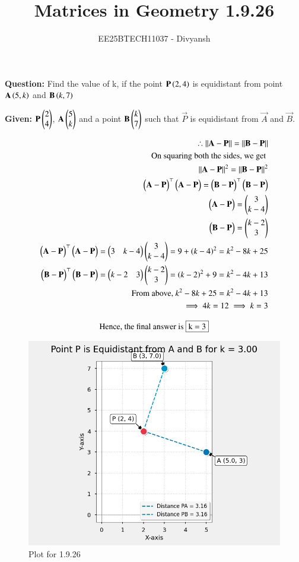 \documentclass[journal,12pt,onecolumn]{IEEEtran}
\title{Matrices in Geometry 1.9.26}
\author{EE25BTECH11037 - Divyansh}
\theoremstyle{remark}
\begin{document}
\vspace{3cm}
\maketitle
{\let\newpage\relax\maketitle}
\textbf{Question: }
Find the value of k, if the point $\mathbf{P}\left(2,4\right)$ is equidistant from point $\mathbf{A}\left(5,k\right)$ and $\mathbf{B}\left(k,7\right)$

\textbf{Given: } 
$\mathbf{P}\begin{pmatrix}2\\4\end{pmatrix}$, $\mathbf{A}\begin{pmatrix}5\\k\end{pmatrix}$ and a point $\mathbf{B} \begin{pmatrix}k \\ 7\end{pmatrix}$ such that $\vec{P}$ is equidistant from $\vec{A}$ and $\vec{B}$. 

\begin{align*}
    \therefore \left\lVert\mathbf{A}-\mathbf{P}\right\rVert=\left\lVert\mathbf{B}-\mathbf{P}\right\rVert\\
    \text{On squaring both the sides, we get }\\
    \left\lVert\mathbf{A}-\mathbf{P}\right\rVert^2=\left\lVert\mathbf{B}-\mathbf{P}\right\rVert^2\\
    \begin{pmatrix}\mathbf{A}-\mathbf{P}\end{pmatrix}^{\top}\begin{pmatrix}\mathbf{A}-\mathbf{P}\end{pmatrix}=\begin{pmatrix}\mathbf{B}-\mathbf{P}\end{pmatrix}^{\top}\begin{pmatrix}\mathbf{B}-\mathbf{P}\end{pmatrix}\\
    \begin{pmatrix}\mathbf{A}-\mathbf{P}\end{pmatrix}=\begin{pmatrix}3 \\ k-4\end{pmatrix}\\
    \begin{pmatrix}\mathbf{B}-\mathbf{P}\end{pmatrix}=\begin{pmatrix}k-2 \\ 3\end{pmatrix}\\
    \begin{pmatrix}\mathbf{A}-\mathbf{P}\end{pmatrix}^{\top}\begin{pmatrix}\mathbf{A}-\mathbf{P}\end{pmatrix}=\begin{pmatrix}3 & k-4\end{pmatrix}\begin{pmatrix}3 \\ k-4\end{pmatrix}=9+\left(k-4\right)^2=k^2 - 8k + 25\\
    \begin{pmatrix}\mathbf{B}-\mathbf{P}\end{pmatrix}^{\top}\begin{pmatrix}\mathbf{B}-\mathbf{P}\end{pmatrix}=\begin{pmatrix}k-2 & 3\end{pmatrix}\begin{pmatrix}k-2 \\ 3\end{pmatrix}=\left(k-2\right)^2 + 9=k^2 -4k+13\\
    \text{From above, } k^2 - 8k + 25=k^2 -4k+13\\
    \implies 4k=12 \implies k=3
\end{align*}


\begin{align*}
 \text{Hence, the final answer is }\fbox{k = 3}   
\end{align*}
\begin{figure}[H]
    \centering
    \includegraphics[width=1\columnwidth]{figs/1.png}
    \caption{Plot for 1.9.26}
    \label{fig:placeholder}
\end{figure}
\end{document}
